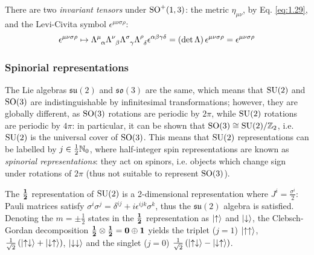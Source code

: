 There are two \textit{invariant tensors} under $ \mathrm{SO}^+(1,3) $: the metric $ \eta_{\mu \nu} $, by Eq. \ref{eq:1.29}, and the Levi-Civita symbol $ \epsilon^{\mu \nu \sigma \rho} $:
\begin{equation*}
  \epsilon^{\mu \nu \sigma \rho} \mapsto \tensor{\Lambda}{^\mu_\alpha} \tensor{\Lambda}{^\nu_\beta} \tensor{\Lambda}{^\sigma_\gamma} \tensor{\Lambda}{^\rho_\delta} \epsilon^{\alpha \beta \gamma \delta} = \left( \det \Lambda \right) \epsilon^{\mu \nu \sigma \rho} = \epsilon^{\mu \nu \sigma \rho}
\end{equation*}

\subsubsection{Spinorial representations}

The Lie algebras $ \mathfrak{su}(2) $ and $ \mathfrak{so}(3) $ are the same, which means that $ \mathrm{SU}(2) $ and $ \mathrm{SO}(3) $ are indistinguishable by infinitesimal transformations; however, they are globally different, as $ \mathrm{SO}(3) $ rotations are periodic by $ 2\pi $, while $ \mathrm{SU}(2) $ rotations are periodic by $ 4\pi $: in particular, it can be shown that $ \mathrm{SO}(3) \cong \mathrm{SU}(2) / \mathbb{Z}_2 $, i.e. $ \mathrm{SU}(2) $ is the universal cover of $ \mathrm{SO}(3) $. This means that $ \mathrm{SU}(2) $ representations can be labelled by $ j \in \frac{1}{2} \mathbb{N}_0 $, where half-integer spin representations are known as \textit{spinorial representations}: they act on spinors, i.e. objects which change sign under rotations of $ 2\pi $ (thus not suitable to represent $ \mathrm{SO}(3) $).

\begin{example}{}{}
  The $ \mathbf{\frac{1}{2}} $ representation of $ \mathrm{SU}(2) $ is a 2-dimensional representation where $ J^i = \frac{\sigma^i}{2} $: Pauli matrices satisfy $ \sigma^i \sigma^j = \delta^{ij} + i \epsilon^{ijk} \sigma^k $, thus the $ \mathfrak{su}(2) $ algebra is satisfied. Denoting the $ m = \pm \frac{1}{2} $ states in the $ \mathbf{\frac{1}{2}} $ representation as $ \ket{\uparrow} $ and $ \ket{\downarrow} $, the Clebsch-Gordan decomposition $ \mathbf{\frac{1}{2}} \otimes \mathbf{\frac{1}{2}} = \mathbf{0} \oplus \mathbf{1} $ yields the triplet ($ j = 1 $) $ \ket{\uparrow\uparrow} $, $ \frac{1}{\sqrt{2}}\left( \ket{\uparrow\downarrow} + \ket{\downarrow\uparrow} \right) $, $ \ket{\downarrow\downarrow} $ and the singlet ($ j = 0 $) $ \frac{1}{\sqrt{2}}\left( \ket{\uparrow\downarrow} - \ket{\downarrow\uparrow} \right) $.
\end{example}

